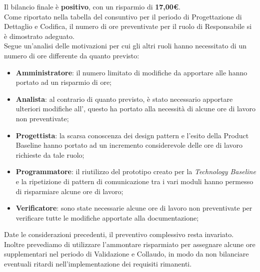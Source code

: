 	Il bilancio finale è \textbf{positivo}, con un risparmio di \textbf{17,00\euro}. \\ Come riportato nella tabella del consuntivo per il periodo di Progettazione di Dettaglio e Codifica, il numero di ore preventivate per il ruolo di Responsabile si è dimostrato adeguato. \\ Segue un'analisi delle motivazioni per cui gli altri ruoli hanno necessitato di un numero di ore differente da quanto previsto: 
	\begin{itemize}
		\item \textbf{Amministratore}: il numero limitato di modifiche da apportare alle \NdP hanno portato ad un risparmio di ore;
		\item \textbf{Analista}: al contrario di quanto previsto, è stato necessario apportare ulteriori modifiche all'\AdR, questo ha portato alla necessità di alcune ore di lavoro non preventivate;
		\item \textbf{Progettista}: la scarsa conoscenza dei design pattern e l'esito della Product Baseline hanno portato ad un incremento considerevole delle ore di lavoro richieste da tale ruolo;
		\item \textbf{Programmatore}: il riutilizzo del prototipo creato per la \textit{Technology Baseline} e la ripetizione di pattern di comunicazione tra i vari moduli hanno permesso di risparmiare alcune ore di lavoro;
		\item \textbf{Verificatore}: sono state necessarie alcune ore di lavoro non preventivate per verificare tutte le modifiche apportate alla documentazione;
	\end{itemize}
	
	Date le considerazioni precedenti, il preventivo complessivo resta invariato. Inoltre prevediamo di utilizzare l'ammontare risparmiato per assegnare alcune ore supplementari nel periodo di Validazione e Collaudo, in modo da non bilanciare eventuali ritardi nell'implementazione dei requisiti rimanenti. 
	
	